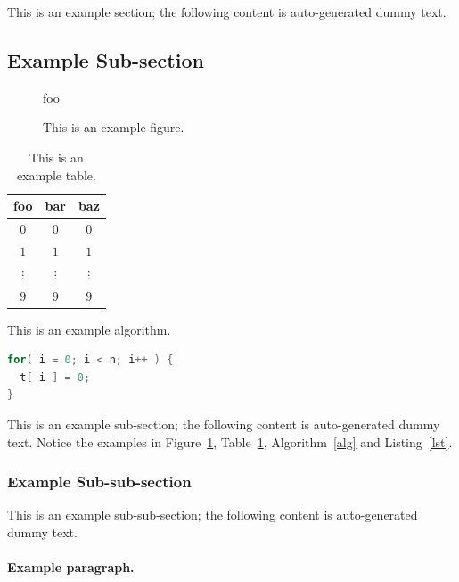 \documentclass[ %
                    author={Luke Murray},
                supervisor={Dr. Simon Hollis},
                     title={Shadow Peer-to-Peer Networks},
                  subtitle={},
                    degree={MEng},
                      year={2013} ]{thesis}
\begin{document}
This is an example section; 
the following content is auto-generated dummy text.
\lipsum

\subsection{Example Sub-section}

\begin{figure}[t]
\centering
foo
\caption{This is an example figure.}
\label{fig}
\end{figure}

\begin{table}[t]
\centering
\begin{tabular}{|cc|c|}
\hline
foo      & bar      & baz      \\
\hline
$0     $ & $0     $ & $0     $ \\
$1     $ & $1     $ & $1     $ \\
$\vdots$ & $\vdots$ & $\vdots$ \\
$9     $ & $9     $ & $9     $ \\
\hline
\end{tabular}
\caption{This is an example table.}
\label{tab}
\end{table}

\begin{algorithm}[t]
\caption{This is an example algorithm.}
\label{alg}
\end{algorithm}

\begin{lstlisting}[float={t},caption={This is an example listing.},label={lst},language=C]
for( i = 0; i < n; i++ ) {
  t[ i ] = 0;
}
\end{lstlisting}

This is an example sub-section;
the following content is auto-generated dummy text.
Notice the examples in Figure~\ref{fig}, Table~\ref{tab}, Algorithm~\ref{alg}
and Listing~\ref{lst}.
\lipsum

\subsubsection{Example Sub-sub-section}

This is an example sub-sub-section;
the following content is auto-generated dummy text.
\lipsum

\paragraph{Example paragraph.}
\end{document}
